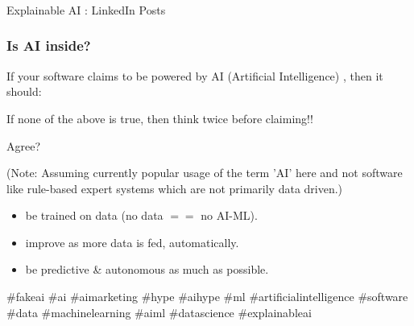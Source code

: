 \begin{frame}[fragile]\frametitle{}
\begin{center}
{\Large Explainable AI : LinkedIn Posts}
\end{center}
\end{frame}

\begin{frame}[fragile]\frametitle{Is AI inside?}
If your software claims to be powered by AI (Artificial Intelligence) ,
then it should:

If none of the above is true, then think twice before claiming!!

Agree?


(Note: Assuming currently popular usage of the term 'AI' here and not software like rule-based expert systems which are not primarily data driven.)

				\begin{itemize}
				\item be trained on data (no data $==$ no AI-ML).
				\item improve as more data is fed, automatically.
				\item be predictive \& autonomous as much as possible.
				\end{itemize}

\#fakeai \#ai \#aimarketing \#hype \#aihype \#ml \#artificialintelligence \#software \#data \#machinelearning \#aiml \#datascience \#explainableai

\end{frame}

